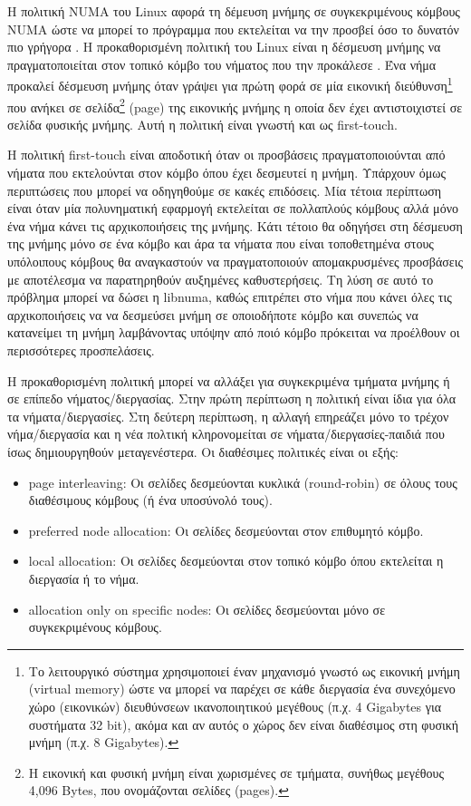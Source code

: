 Η πολιτική NUMA του Linux αφορά τη δέμευση μνήμης σε συγκεκριμένους κόμβους NUMA ώστε να μπορεί το πρόγραμμα που εκτελείται να την προσβεί όσο το δυνατόν πιο γρήγορα \cite{kleen2005numa}. Η προκαθορισμένη πολιτική του Linux είναι η δέσμευση μνήμης να πραγματοποιείται στον τοπικό κόμβο του νήματος που την προκάλεσε \cite[\texttt{mm/mempolicy.c}]{linux}. Ένα νήμα προκαλεί δέσμευση μνήμης όταν γράψει για πρώτη φορά σε μία εικονική διεύθυνση\footnote{Το λειτουργικό σύστημα χρησιμοποιεί έναν μηχανισμό γνωστό ως εικονική μνήμη (virtual memory) ώστε να μπορεί να παρέχει σε κάθε διεργασία ένα συνεχόμενο χώρο (εικονικών) διευθύνσεων ικανοποιητικού μεγέθους (π.χ. 4 Gigabytes για συστήματα 32 bit), ακόμα και αν αυτός ο χώρος δεν είναι διαθέσιμος στη φυσική μνήμη (π.χ. 8 Gigabytes).} που ανήκει σε σελίδα\footnote{Η εικονική και φυσική μνήμη είναι χωρισμένες σε τμήματα, συνήθως μεγέθους 4,096 Bytes, που ονομάζονται σελίδες (pages).} (page) της εικονικής μνήμης η οποία δεν έχει αντιστοιχιστεί σε σελίδα φυσικής μνήμης. Αυτή η πολιτική είναι γνωστή και ως first-touch. 

Η πολιτική first-touch είναι αποδοτική όταν οι προσβάσεις πραγματοποιούνται από νήματα που εκτελούνται στον κόμβο όπου έχει δεσμευτεί η μνήμη. Υπάρχουν όμως περιπτώσεις που μπορεί να οδηγηθούμε σε κακές επιδόσεις. Μία τέτοια περίπτωση είναι όταν μία πολυνηματική εφαρμογή εκτελείται σε πολλαπλούς κόμβους αλλά μόνο ένα νήμα κάνει τις αρχικοποιήσεις της μνήμης. Κάτι τέτοιο θα οδηγήσει στη δέσμευση της μνήμης μόνο σε ένα κόμβο και άρα τα νήματα που είναι τοποθετημένα στους υπόλοιπους κόμβους θα αναγκαστούν να πραγματοποιούν απομακρυσμένες προσβάσεις με αποτέλεσμα να παρατηρηθούν αυξημένες καθυστερήσεις. Τη λύση σε αυτό το πρόβλημα μπορεί να δώσει η libnuma, καθώς επιτρέπει στο νήμα που κάνει όλες τις αρχικοποιήσεις να να δεσμεύσει μνήμη σε οποιοδήποτε κόμβο και συνεπώς να κατανείμει τη μνήμη λαμβάνοντας υπόψην από ποιό κόμβο πρόκειται να προέλθουν οι περισσότερες προσπελάσεις.

Η προκαθορισμένη πολιτική μπορεί να αλλάξει για συγκεκριμένα τμήματα μνήμης ή σε επίπεδο νήματος/διεργασίας. Στην πρώτη περίπτωση η πολιτική είναι ίδια για όλα τα νήματα/διεργασίες. Στη δεύτερη περίπτωση, η αλλαγή επηρεάζει μόνο το τρέχον νήμα/διεργασία και η νέα πολτική κληρονομείται σε νήματα/διεργασίες-παιδιά που ίσως δημιουργηθούν μεταγενέστερα. Οι διαθέσιμες πολιτικές είναι οι εξής:
\begin{itemize}
	\item page interleaving: Οι σελίδες δεσμεύονται κυκλικά (round-robin) σε όλους τους διαθέσιμους κόμβους (ή ένα υποσύνολό τους).
	\item preferred node allocation: Οι σελίδες δεσμεύονται στον επιθυμητό κόμβο.
	\item local allocation: Οι σελίδες δεσμεύονται στον τοπικό κόμβο όπου εκτελείται η διεργασία ή το νήμα.
	\item allocation only on specific nodes: Οι σελίδες δεσμεύονται μόνο σε συγκεκριμένους κόμβους.
\end{itemize}

